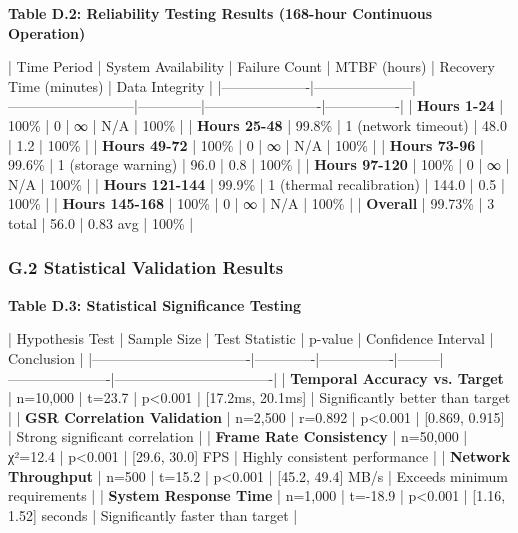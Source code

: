 \documentclass[11pt,a4paper]{article}
\begin{document}
\textbf{Table D.2: Reliability Testing Results (168-hour Continuous Operation)}

| Time Period       | System Availability | Failure Count             | MTBF (hours) | Recovery Time (minutes) | Data Integrity |
|-------------------|---------------------|---------------------------|--------------|-------------------------|----------------|
| \textbf{Hours 1-24}    | 100\%                | 0                         | ∞            | N/A                     | 100\%           |
| \textbf{Hours 25-48}   | 99.8\%               | 1 (network timeout)       | 48.0         | 1.2                     | 100\%           |
| \textbf{Hours 49-72}   | 100\%                | 0                         | ∞            | N/A                     | 100\%           |
| \textbf{Hours 73-96}   | 99.6\%               | 1 (storage warning)       | 96.0         | 0.8                     | 100\%           |
| \textbf{Hours 97-120}  | 100\%                | 0                         | ∞            | N/A                     | 100\%           |
| \textbf{Hours 121-144} | 99.9\%               | 1 (thermal recalibration) | 144.0        | 0.5                     | 100\%           |
| \textbf{Hours 145-168} | 100\%                | 0                         | ∞            | N/A                     | 100\%           |
| \textbf{Overall}       | 99.73\%              | 3 total                   | 56.0         | 0.83 avg                | 100\%           |

\subsubsection{G.2 Statistical Validation Results}

\textbf{Table D.3: Statistical Significance Testing}

| Hypothesis Test                  | Sample Size | Test Statistic | p-value | Confidence Interval  | Conclusion                       |
|----------------------------------|-------------|----------------|---------|----------------------|----------------------------------|
| \textbf{Temporal Accuracy vs. Target} | n=10,000    | t=23.7         | p<0.001 | [17.2ms, 20.1ms]     | Significantly better than target |
| \textbf{GSR Correlation Validation}   | n=2,500     | r=0.892        | p<0.001 | [0.869, 0.915]       | Strong significant correlation   |
| \textbf{Frame Rate Consistency}       | n=50,000    | χ²=12.4        | p<0.001 | [29.6, 30.0] FPS     | Highly consistent performance    |
| \textbf{Network Throughput}           | n=500       | t=15.2         | p<0.001 | [45.2, 49.4] MB/s    | Exceeds minimum requirements     |
| \textbf{System Response Time}         | n=1,000     | t=-18.9        | p<0.001 | [1.16, 1.52] seconds | Significantly faster than target |
\end{document}
